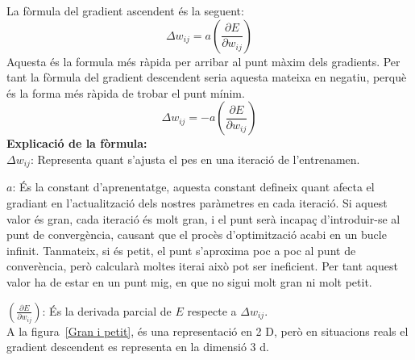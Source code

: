 \begin{enumerate}
\begin{itemize}
          La fòrmula del gradient ascendent és la seguent:
          $$\Delta w_{ij} = a \left( \frac{\partial E}{\partial w_{ij}} \right)$$
          Aquesta és la formula més ràpida per arribar al punt màxim dels gradients. Per tant la fòrmula del gradient descendent seria aquesta mateixa en negatiu, perquè és la forma més ràpida de trobar el punt mínim.
          $$\Delta w_{ij} = -a \left( \frac{\partial E}{\partial w_{ij}} \right)$$
          \textbf{Explicació de la fòrmula:}\\
           $\Delta w_{ij}$: Representa quant s'ajusta el pes en una iteració de l'entrenamen.

           $a$: És la constant d'aprenentatge, aquesta constant defineix quant afecta el gradiant en l'actualització dels nostres paràmetres en cada iteració. Si aquest valor és gran, cada iteració és molt gran, i el punt serà incapaç d'introduir-se al punt de convergència, causant que el procès d'optimització acabi en un bucle infinit. Tanmateix, si és petit, el punt s'aproxima poc a poc al punt de converència, però calcularà moltes iterai això pot ser ineficient. Per tant aquest valor ha de estar en un punt mig, en que no sigui molt gran ni molt petit.

           $\left( \frac{\partial E}{\partial w_{ij}} \right)$: És la derivada parcial de $E$ respecte a $\Delta w_{ij}$. \\

           A la figura~\ref{Gran i petit}, és una representació en 2 D, però en situacions reals el gradient descendent es representa en la dimensió 3 d.


\end{itemize}
\end{enumerate}

